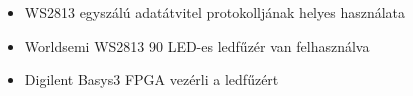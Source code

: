 \begin{itemize}
\item WS2813 egyszálú adatátvitel protokolljának helyes használata
\item Worldsemi WS2813 90 LED-es ledfűzér van felhasználva
\item Digilent Basys3 FPGA vezérli a ledfűzért 
\end{itemize}